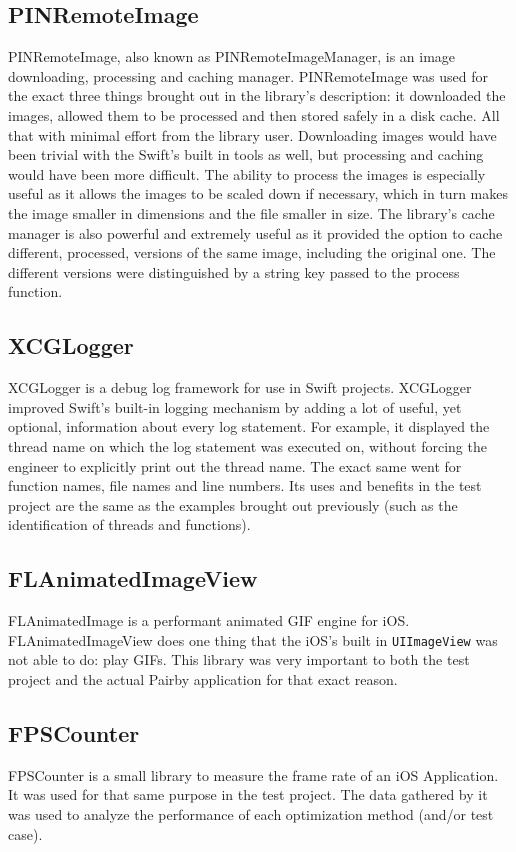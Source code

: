 \documentclass[a4paper,12pt]{article}
\begin{document}
\subsection{PINRemoteImage}
PINRemoteImage, also known as PINRemoteImageManager, is an image downloading, processing and caching manager.\cite{PINRemoteImage} PINRemoteImage was used for the exact three things brought out in the library's description: it downloaded the images, allowed them to be processed and then stored safely in a disk cache. All that with minimal effort from the library user. Downloading images would have been trivial with the Swift's built in tools as well, but processing and caching would have been more difficult. The ability to process the images is especially useful as it allows the images to be scaled down if necessary, which in turn makes the image smaller in dimensions and the file smaller in size. The library's cache manager is also powerful and extremely useful as it provided the option to cache different, processed, versions of the same image, including the original one. The different versions were distinguished by a string key passed to the process function.

\subsection{XCGLogger}
XCGLogger is a debug log framework for use in Swift projects.\cite{XCGLogger} XCGLogger improved Swift's built-in logging mechanism by adding a lot of useful, yet optional, information about every log statement. For example, it displayed the thread name on which the log statement was executed on, without forcing the engineer to explicitly print out the thread name. The exact same went for function names, file names and line numbers. Its uses and benefits in the test project are the same as the examples brought out previously (such as the identification of threads and functions).

\subsection{FLAnimatedImageView}
FLAnimatedImage is a performant animated GIF engine for iOS.\cite{FLAnimatedImageView} FLAnimatedImageView does one thing that the iOS's built in \texttt{UIImageView} was not able to do: play GIFs. This library was very important to both the test project and the actual Pairby application for that exact reason.

\subsection{FPSCounter}
FPSCounter is a small library to measure the frame rate of an iOS Application.\cite{FPSCounterGithub} It was used for that same purpose in the test project. The data gathered by it was used to analyze the performance of each optimization method (and/or test case).
\end{document}
